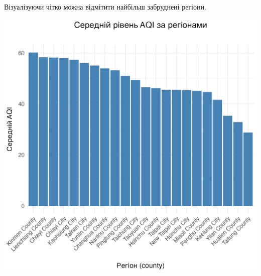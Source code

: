 \documentclass{article}
\begin{document}
\begin{enumerate}
    Візуалізуючи чітко можна відмітити найбільш забруднені регіони.
    \begin{center}
    \includegraphics[width=6in]{question4/avg_aqi_by_county.png}
    \end{center}


\end{enumerate}
\end{document}

